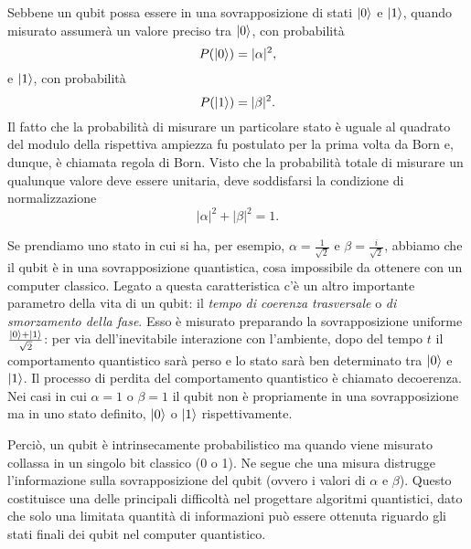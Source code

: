Sebbene un qubit possa essere in una sovrapposizione di stati $\ket{0}$ e $\ket{1}$, quando 
misurato assumerà un valore preciso tra $\ket{0}$, con probabilità 
\begin{equation}
    P(\ket{0}) = |\alpha|^2,
\end{equation}
e $\ket{1}$, con probabilità 
\begin{equation}
    P(\ket{1}) = |\beta|^2.
\end{equation}
Il fatto che la probabilità di misurare un particolare stato è uguale al quadrato del modulo 
della rispettiva ampiezza fu postulato per la prima volta da Born %
e, dunque, è chiamata regola di Born. Visto che la probabilità totale di misurare un qualunque 
valore deve essere unitaria, deve soddisfarsi la condizione di normalizzazione 
\begin{equation}
    |\alpha|^2 + |\beta|^2 = 1.
\end{equation}

Se prendiamo uno stato in cui si ha, per esempio, $\alpha = \frac{1}{\sqrt{2}}$ e 
$\beta = \frac{i}{\sqrt{2}}$, abbiamo che il qubit è in una sovrapposizione quantistica, 
cosa impossibile da ottenere con un computer classico. Legato a questa caratteristica 
c'è un altro importante parametro della vita di un qubit: il \emph{tempo di coerenza 
trasversale} o \emph{di smorzamento della fase}. 
Esso è misurato preparando la sovrapposizione uniforme $\frac{\ket{0} + \ket{1}}{\sqrt{2}}$: 
per via dell'inevitabile interazione con l'ambiente, dopo del tempo $t$ il comportamento 
quantistico sarà perso e lo stato sarà ben determinato tra $\ket{0}$ e $\ket{1}$. %
Il processo di perdita del comportamento quantistico è chiamato decoerenza. 
Nei casi in cui $\alpha = 1$ o $\beta = 1$ il qubit non è propriamente in una sovrapposizione ma 
in uno stato definito, $\ket{0}$ o $\ket{1}$ rispettivamente. 

Perciò, un qubit è intrinsecamente probabilistico ma quando viene misurato collassa in un 
singolo bit classico (0 o 1). 
Ne segue che una misura distrugge l'informazione sulla sovrapposizione del qubit (ovvero i valori 
di $\alpha$ e $\beta$). Questo costituisce una delle principali difficoltà nel progettare 
algoritmi quantistici, dato che solo una limitata quantità di informazioni può essere ottenuta 
riguardo gli stati finali dei qubit nel computer quantistico. 

